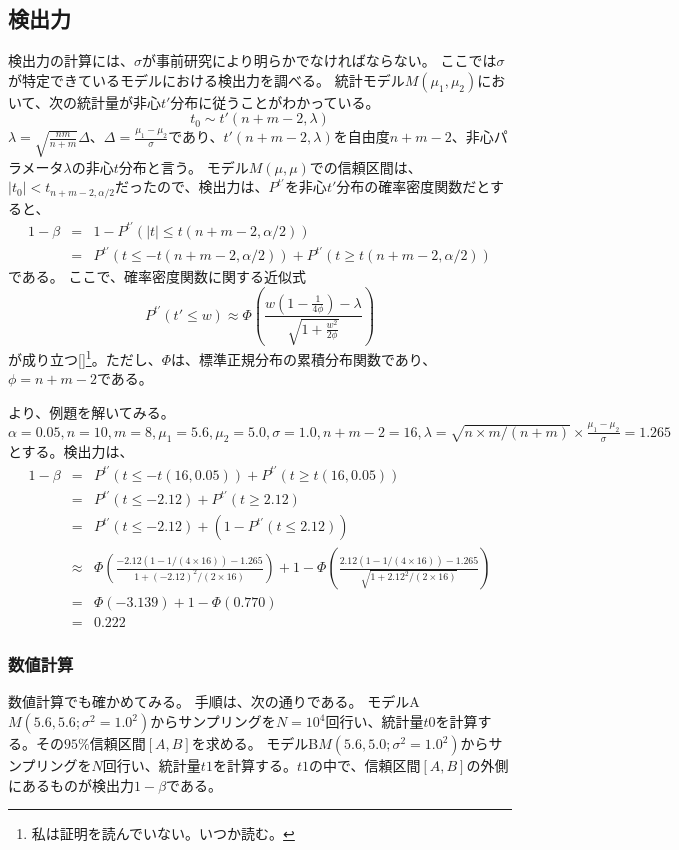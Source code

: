 \subsection{検出力}
検出力の計算には、$\sigma$が事前研究により明らかでなければならない。
ここでは$\sigma$が特定できているモデルにおける検出力を調べる。
統計モデル$M(\mu_1,\mu_2)$において、次の統計量が非心$t'$分布に従うことがわかっている。
\begin{equation*}
     t_0\sim t'(n+m-2,\lambda)
\end{equation*}
$\lambda = \sqrt{\frac{nm}{n+m}}\Delta$、$\Delta =\frac{\mu_1-\mu_2}{\sigma}$であり、$t'(n+m-2,\lambda)$を自由度$n+m-2$、非心パラメータ$\lambda$の非心$t$分布と言う。
モデル$M(\mu,\mu)$での信頼区間は、$|t_0|<t_{n+m-2,\alpha/2}$だったので、検出力は、$P^{t'}$を非心$t'$分布の確率密度関数だとすると、
\begin{eqnarray*}
    1-\beta &=& 1-P^{t'}( |t| \leq t(n+m-2,\alpha/2)) \\
    &=& P^{t'}( t \leq -t(n+m-2,\alpha/2))+P^{t'}(t \geq t(n+m-2,\alpha/2))
\end{eqnarray*}
である。
ここで、確率密度関数に関する近似式
\begin{equation*}
    P^{t'}(t'\leq w) \approx \varPhi \left( \frac{w(1-\frac{1}{4\phi})-\lambda}{\sqrt{1+\frac{w^2}{2\phi}}} \right)
\end{equation*}
が成り立つ[\cite{2003サンプルサイズの決め方}]\footnote{私は証明を読んでいない。いつか読む。}。ただし、$\varPhi$は、標準正規分布の累積分布関数であり、$\phi=n+m-2$である。

\cite{2003サンプルサイズの決め方}より、例題を解いてみる。
$\alpha=0.05,n=10,m=8,\mu_1=5.6,\mu_2=5.0,\sigma=1.0,n+m-2 = 16,\lambda=\sqrt{n\times m/(n+m)} \times \frac{\mu_1-\mu_2}{\sigma} = 1.265 $とする。検出力は、
\begin{eqnarray*}
    1-\beta &=& P^{t'}(t \leq -t(16,0.05))+P^{t'}(t \geq t(16,0.05)) \\
    &=& P^{t'}(t \leq -2.12)+P^{t'}(t\geq 2.12) \\
    &=& P^{t'}(t \leq -2.12)+(1-P^{t'}(t\leq 2.12)) \\
    &\approx& \varPhi(\frac{-2.12(1-1/(4\times 16))-1.265}{1+(-2.12)^2/(2\times 16)}) +1-\varPhi(\frac{2.12(1-1/(4\times 16))-1.265}{\sqrt{1+2.12^2/(2\times 16)}}) \\
    &=& \varPhi(-3.139)+1-\varPhi(0.770) \\
    &=& 0.222
\end{eqnarray*}

\subsubsection*{数値計算}
数値計算でも確かめてみる。
手順は、次の通りである。
モデルA$M(5.6,5.6;\sigma^2=1.0^2)$からサンプリングを$N=10^4$回行い、統計量$t0$を計算する。その$95\%$信頼区間$[A,B]$を求める。
モデルB$M(5.6,5.0;\sigma^2=1.0^2)$からサンプリングを$N$回行い、統計量$t1$を計算する。$t1$の中で、信頼区間$[A,B]$の外側にあるものが検出力$1-\beta$である。

